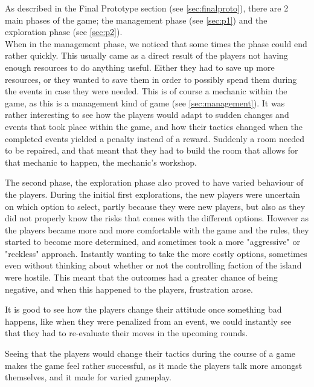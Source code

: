 As described in the Final Prototype section (see \ref{sec:finalproto}), there are 2 main phases of the game; the management phase (see \ref{sec:p1}) and the exploration phase (see \ref{sec:p2}).\\When in the management phase, we noticed that some times the phase could end rather quickly. This usually came as a direct result of the players not having enough resources to do anything useful. Either they had to save up more resources, or they wanted to save them in order to possibly spend them during the events in case they were needed. This is of course a mechanic within the game, as this is a management kind of game (see \ref{sec:management}). It was rather interesting to see how the players would adapt to sudden changes and events that took place within the game, and how their tactics changed when the completed events yielded a penalty instead of a reward. Suddenly a room needed to be repaired, and that meant that they had to build the room that allows for that mechanic to happen, the mechanic's workshop.

The second phase, the exploration phase also proved to have varied behaviour of the players. During the initial first explorations, the new players were uncertain on which option to select, partly because they were new players, but also as they did not properly know the risks that comes with the different options. However as the players became more and more comfortable with the game and the rules, they started to become more determined, and sometimes took a more "aggressive" or "reckless" approach. Instantly wanting to take the more costly options, sometimes even without thinking about whether or not the controlling faction of the island were hostile. This meant that the outcomes had a greater chance of being negative, and when this happened to the players, frustration arose. 

It is good to see how the players change their attitude once something bad happens, like when they were penalized from an event, we could instantly see that they had to re-evaluate their moves in the upcoming rounds. 

Seeing that the players would change their tactics during the course of a game makes the game feel rather successful, as it made the players talk more amongst themselves, and it made for varied gameplay.

